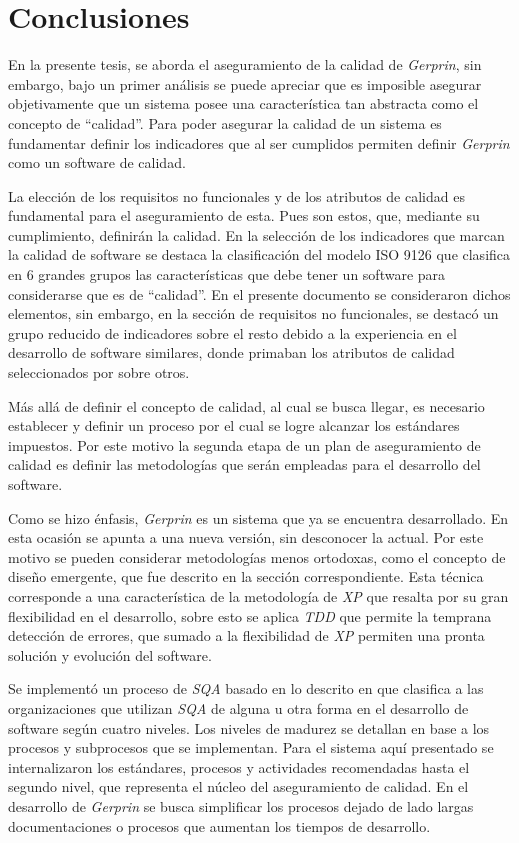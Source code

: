 
\chapter{Conclusiones }

En la presente tesis, se aborda el aseguramiento de la calidad de \emph{Gerprin}, sin embargo, bajo un primer análisis se puede apreciar que es imposible asegurar objetivamente que un sistema posee una característica tan abstracta como el concepto de “calidad”. Para poder asegurar la calidad de un sistema es fundamentar definir los indicadores que al ser cumplidos permiten definir \emph{Gerprin} como un software de calidad.

La elección de los requisitos no funcionales y de los atributos de calidad es fundamental para el aseguramiento de esta. Pues son estos, que, mediante su cumplimiento, definirán la calidad. En la selección de los indicadores que marcan la calidad de software se destaca la clasificación del modelo ISO 9126 que clasifica en 6 grandes grupos las características que debe tener un software para considerarse que es de “calidad”. En el presente documento se consideraron dichos elementos, sin embargo, en la sección de requisitos no funcionales, se destacó un grupo reducido de indicadores sobre el resto debido a la experiencia en el desarrollo de software similares, donde primaban los atributos de calidad seleccionados por sobre otros.

Más allá de definir el concepto de calidad, al cual se busca llegar, es necesario establecer y definir un proceso por el cual se logre alcanzar los estándares impuestos. Por este motivo la segunda etapa de un plan de aseguramiento de calidad es definir las metodologías que serán empleadas para el desarrollo del software. 

Como se hizo énfasis, \emph{Gerprin} es un sistema que ya se encuentra desarrollado. En esta ocasión se apunta a una nueva versión, sin desconocer la actual. Por este motivo se pueden considerar metodologías menos ortodoxas, como el concepto de diseño emergente, que fue descrito en la sección correspondiente. Esta técnica corresponde a una característica de la metodología de \emph{XP} que resalta por su gran flexibilidad en el desarrollo, sobre esto se aplica \emph{TDD} que permite la temprana detección de errores, que sumado a la flexibilidad de \emph{XP} permiten una pronta solución y evolución del software.

Se implementó un proceso de \emph{SQA} basado en lo descrito en \citealp{web00} que clasifica a las organizaciones que utilizan \emph{SQA} de alguna u otra forma en el desarrollo de software según cuatro niveles. Los niveles de madurez se detallan en base a los procesos y subprocesos que se implementan. Para el sistema aquí presentado se internalizaron los estándares, procesos y actividades recomendadas hasta el segundo nivel, que representa el núcleo del aseguramiento de calidad. En el desarrollo de \emph{Gerprin} se busca simplificar los procesos dejado de lado largas documentaciones o procesos que aumentan los tiempos de desarrollo. 

